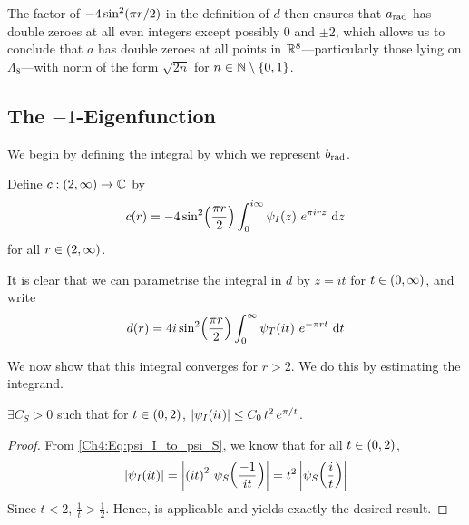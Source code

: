 The factor of $-4\sin^2\!\left( \pi r / 2 \right)$ in the definition of $d$ then ensures that $a_{\operatorname{rad}}$ has double zeroes at all even integers except possibly $0$ and $\pm 2$, which allows us to conclude that $a$ has double zeroes at all points in $\mathbb{R}^8$---particularly those lying on $\Lambda_8$---with norm of the form $\sqrt{2n}$ for $n \in \mathbb{N} \setminus \left\{ 0, 1 \right\}$.

\subsection{The $-1$-Eigenfunction}

We begin by defining the integral by which we represent $b_{\operatorname{rad}}$.

\begin{boxdefinition}
    Define $c : \left( 2, \infty \right) \to \mathbb{C}$ by
    \begin{align*}
        c\!\left( r \right) = -4 \sin^2\!\left( \frac{\pi r}{2} \right) \int_{0}^{i\infty} \psi_I\!\left( z \right) \, e^{\pi i r z} \, \operatorname{d}\!{z}
    \end{align*}
    for all $r \in \left( 2, \infty \right)$.
\end{boxdefinition}

It is clear that we can parametrise the integral in $d$ by $z = it$ for $t \in \left( 0, \infty \right)$, and write
\begin{align}
    d(r) = 4i \sin^2\!\left( \frac{\pi r}{2} \right) \int_{0}^{\infty} \psi_T\!\left( it \right) \, e^{-\pi r t} \, \operatorname{d}\!{t}
    \label{Ch4:Eq:c_parametrised}
\end{align}

We now show that this integral converges for $r > 2$. We do this by estimating the integrand.

\begin{boxlemma}
    $\exists C_S > 0$ such that for $t \in \left( 0, 2 \right)$, $\left\lvert \psi_I\!\left( it \right) \right\rvert \leq C_0 \, t^2 \, e^{\pi / t}$.
\end{boxlemma}
\begin{proof}
    From \eqref{Ch4:Eq:psi_I_to_psi_S}, we know that for all $t \in \left( 0, 2 \right)$,
    \begin{align*}
        \left\lvert \psi_I\!\left( it \right) \right\rvert
        = \left\lvert \left( it \right)^2 \, \psi_S\!\left( \frac{-1}{it} \right) \right\rvert
        = t^2 \left\lvert \psi_S\!\left( \frac{i}{t} \right) \right\rvert
    \end{align*}
    Since $t < 2$, $\frac{1}{t} > \frac{1}{2}$. Hence,  is applicable and yields exactly the desired result.
\end{proof}

